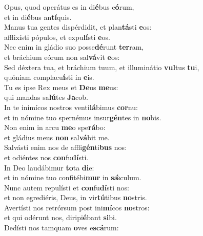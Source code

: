 \evenverse Opus, quod operátus es in di\textbf{é}bus e\textbf{ó}rum,~\*\\
\evenverse et in di\textbf{é}bus an\textbf{tí}quis.\\
\oddverse Manus tua gentes dispérdidit, et plan\textbf{tá}sti \textbf{e}os:~\*\\
\oddverse afflixísti pópulos, et expu\textbf{lí}sti \textbf{e}os.\\
\evenverse Nec enim in gládio suo posse\textbf{dé}runt \textbf{ter}ram,~\*\\
\evenverse et bráchium eórum non sal\textbf{vá}vit \textbf{e}os:\\
\oddverse Sed déxtera tua, et bráchium tuum, et illuminátio \textbf{vul}tus \textbf{tu}i,~\*\\
\oddverse quóniam complacu\textbf{í}sti in \textbf{e}is.\\
\evenverse Tu es ipse Rex meus et \textbf{De}us \textbf{me}us:~\*\\
\evenverse qui mandas sa\textbf{lú}tes \textbf{Ja}cob.\\
\oddverse In te inimícos nostros venti\textbf{lá}bimus \textbf{cor}nu:~\*\\
\oddverse et in nómine tuo spernémus insur\textbf{gén}tes in \textbf{no}bis.\\
\evenverse Non enim in arcu \textbf{me}o spe\textbf{rá}bo:~\*\\
\evenverse et gládius meus \textbf{non} sal\textbf{vá}bit me.\\
\oddverse Salvásti enim nos de affli\textbf{gén}ti\textbf{bus} nos:~\*\\
\oddverse et odiéntes nos \textbf{con}fu\textbf{dí}sti.\\
\evenverse In Deo laudábimur \textbf{to}ta \textbf{di}e:~\*\\
\evenverse et in nómine tuo confitébi\textbf{mur} in \textbf{sǽ}culum.\\
\oddverse Nunc autem repulísti et \textbf{con}fu\textbf{dí}sti nos:~\*\\
\oddverse et non egrediéris, Deus, in vir\textbf{tú}tibus \textbf{no}stris.\\
\evenverse Avertísti nos retrórsum post ini\textbf{mí}cos \textbf{no}stros:~\*\\
\evenverse et qui odérunt nos, diripi\textbf{é}bant \textbf{si}bi.\\
\oddverse Dedísti nos tamquam \textbf{o}ves e\textbf{scá}rum:~\*\\
